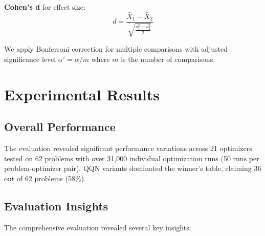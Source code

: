 \textbf{Cohen's d} for effect size:
\[d = \frac{\bar{X}_1 - \bar{X}_2}{\sqrt{\frac{s_1^2 + s_2^2}{2}}}\]

We apply Bonferroni correction for multiple comparisons with adjusted significance level \(\alpha' = \alpha / m\) where \(m\) is the number of comparisons.

\hypertarget{experimental-results}{%
\section{Experimental Results}\label{experimental-results}}

\hypertarget{overall-performance}{%
\subsection{Overall Performance}\label{overall-performance}}

The evaluation revealed significant performance variations across 21 optimizers tested on 62 problems with over 31,000 individual optimization runs (50 runs per problem-optimizer pair). QQN variants dominated the winner's table, claiming 36 out of 62 problems (58\%).

\hypertarget{evaluation-insights}{%
\subsection{Evaluation Insights}\label{evaluation-insights}}

The comprehensive evaluation revealed several key insights:

